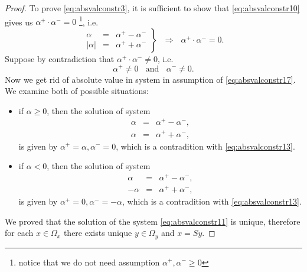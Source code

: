 \begin{proof}
\noindent To prove \eqref{eq:absvalconstr3}, it is sufficient to show that \eqref{eq:absvalconstr10} gives us $\alpha^{+} \cdot \alpha^{-} = 0$
\footnote{notice that we do not need assumption $\alpha^{+},\alpha^{-} \geq 0$}, 
i.e.
\begin{equation}
 \label{eq:absvalconstr17}
 \left.
 \begin{array}{rcl}
  \alpha & = & \alpha^{+} - \alpha^{-} \\
  \vert \alpha \vert & = & \alpha^{+} + \alpha^{-}
 \end{array}
 \right\rbrace ~~~ \Rightarrow
 ~~~ \alpha^{+} \cdot \alpha^{-} = 0.
\end{equation}
Suppose by contradiction that $\alpha^{+} \cdot \alpha^{-} \neq 0$, i.e.
\begin{equation}
 \label{eq:absvalconstr13}
 \alpha^{+} \neq 0 ~~~~ \textrm{and} ~~~~ \alpha^{-} \neq 0.
\end{equation}
Now we get rid of absolute value in system in assumption of \eqref{eq:absvalconstr17}.
We examine both of possible situations:
\begin{itemize}
 \item if $\alpha \geq 0$, then the solution of system
  \begin{displaymath}
   \begin{array}{rcl}
    \alpha & = & \alpha^{+} - \alpha^{-}, \\
    \alpha& = & \alpha^{+} + \alpha^{-}, 
   \end{array}
  \end{displaymath}
  is given by $\alpha^{+} = \alpha, \alpha^{-} = 0$, which is a contradition with \eqref{eq:absvalconstr13}.
 \item if $\alpha < 0$, then the solution of system
  \begin{displaymath}
   \begin{array}{rcl}
    \alpha & = & \alpha^{+} - \alpha^{-}, \\
    -\alpha& = & \alpha^{+} + \alpha^{-}, 
   \end{array}
  \end{displaymath}
  is given by $\alpha^{+} = 0, \alpha^{-} = -\alpha$, which is a contradition with \eqref{eq:absvalconstr13}.
\end{itemize}

We proved that the solution of the system \eqref{eq:absvalconstr11} is unique, therefore for each $x \in \Omega_x$ there exists unique $y \in \Omega_y$ and $x = Sy$.

\end{proof}

